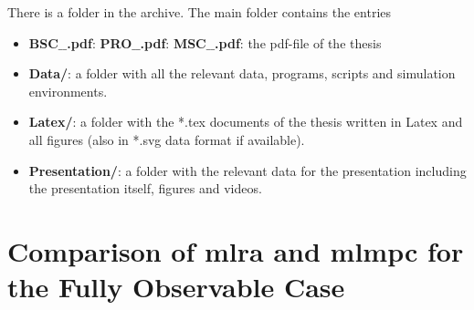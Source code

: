\begin{appendix}
{	%
	There is a folder
 in the archive. The main folder contains the entries
	\begin{itemize}
		\item {}
		{\textbf{BSC$\_$\NummerDerArbeit$\_$\NachnameDesStudenten.pdf}:}{}
		{\textbf{PRO$\_$\NummerDerArbeit$\_$\NachnameDesStudenten.pdf}:}{}
		{\textbf{MSC$\_$\NummerDerArbeit$\_$\NachnameDesStudenten.pdf}:}{}
		the pdf-file of the thesis
		\item \textbf{Data/}: a folder with all the relevant data, programs, scripts and simulation environments.
		\item \textbf{Latex/}: a folder with the *.tex documents of the thesis
		written in Latex and all figures (also in *.svg data format if available).
		\item \textbf{Presentation/}: a folder with the relevant data for the presentation including the presentation itself, figures and videos.
	\end{itemize}
}{}

\section{Comparison of \ac{mlra} and \ac{mlmpc} for the Fully Observable Case}\label{apx:fo-comparison}


\end{appendix}
